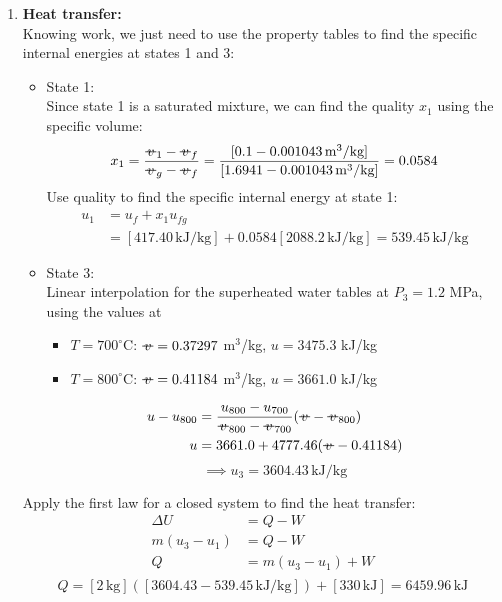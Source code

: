 \documentclass[12pt]{article}
\newcommand{\svol}{%
  \mathord{\text{\ooalign{%
    \hfil$v$\hfil\cr
    \hfil\rule[0.6ex]{0.8em}{0.5pt}\hfil
  }}}%
}
\begin{document}
\begin{enumerate}
\newpage
    \item \textbf{Heat transfer:}\\
    Knowing work, we just need to use the property tables to find the specific internal energies at states 1 and 3:
    \begin{itemize}
        \item State 1:\\
        Since state 1 is a saturated mixture, we can find the quality $x_1$ using the specific volume:
        \[x_1 = \frac{\svol_1 -\svol_f}{\svol_g-\svol_f} = \frac{[0.1 - 0.001043\,\text{m}^3/\text{kg}]}{[1.6941 - 0.001043\,\text{m}^3/\text{kg}]} = 0.0584\]
        Use quality to find the specific internal energy at state 1:
        \[\begin{aligned}
        u_1 &= u_f + x_1u_{fg}\\
        &= [417.40\,\text{kJ/kg}] + 0.0584[2088.2\,\text{kJ/kg}] = 539.45\,\text{kJ/kg}
        \end{aligned}\]
        \item State 3:\\
        Linear interpolation for the superheated water tables at $P_3 = 1.2$ MPa, using the values at
        \begin{itemize}
            \item $T=700^\circ$C: $\svol = 0.37297$ m$^3$/kg, $u = 3475.3$ kJ/kg
            \item $T=800^\circ$C: $\svol = 0.41184$ m$^3$/kg, $u = 3661.0$ kJ/kg
        \end{itemize}
        \[\begin{aligned}
        u - u_{800} &= \frac{u_{800}-u_{700}}{\svol_{800}-\svol_{700}}(\svol-\svol_{800})\\
        u &= 3661.0 + 4777.46(\svol - 0.41184)
        \end{aligned}\]
        \[\implies u_3 = 3604.43\,\text{kJ/kg}\]
    \end{itemize}
    Apply the first law for a closed system to find the heat transfer:
    \[\begin{aligned}
        \Delta U &= Q - W\\
        m(u_3 - u_1) &= Q - W\\
        Q &= m(u_3 - u_1) + W\\
    \end{aligned}\]
    \[Q = [2\,\text{kg}]([3604.43 - 539.45\,\text{kJ/kg}]) + [330\,\text{kJ}] = \boxed{6459.96\,\text{kJ}}\]
\end{enumerate}
\end{document}
